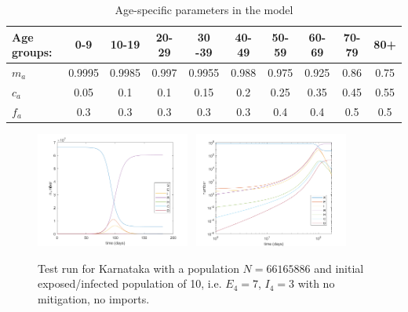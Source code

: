 \documentclass{article}
\begin{document}
\begin{table}[H]
  \centering
  \begin{tabular}{l c c c c c c c c c}
    \toprule
    Age groups: & 0-9 & 10-19 & 20-29 & 30 -39 & 40-49 & 50-59 & 60-69 & 70-79 & 80+ \\
    \midrule
    $m_a$ & 0.9995 & 0.9985 & 0.997 & 0.9955 & 0.988 & 0.975 & 0.925 & 0.86 & 0.75 \\
    $c_a$ & 0.05 & 0.1 & 0.1 & 0.15 & 0.2 & 0.25 & 0.35 & 0.45 & 0.55 \\
    $f_a$ & 0.3 & 0.3 & 0.3 & 0.3 & 0.3 & 0.4 & 0.4 & 0.5 & 0.5 \\
    \bottomrule
  \end{tabular}
  \caption{Age-specific parameters in the model}
  \label{table:age_specific_parameters}
\end{table}

\begin{figure}[H]
    \centering
    \includegraphics[width=0.45\textwidth]{neherlab-comparison/real-time-plot-1}~
    \includegraphics[width=0.45\textwidth]{neherlab-comparison/log-log-plot-1}
    \caption{Test run for Karnataka with a population $N = 66165886$ and initial exposed/infected population of 10, i.e. $E_4 = 7$, $I_4 = 3$ with no mitigation, no imports.}
    \label{fig:dynamics-no-mitigation}
\end{figure}
\end{document}
